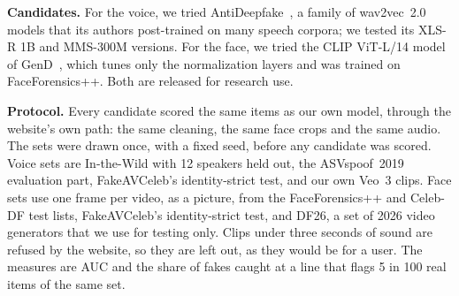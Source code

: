 \textbf{Candidates.} For the voice, we tried AntiDeepfake~\cite{antideepfake},
a family of wav2vec~2.0 models that its authors post-trained on many speech
corpora; we tested its XLS-R 1B and MMS-300M versions. For the face, we tried
the CLIP ViT-L/14 model of GenD~\cite{gend}, which tunes only the
normalization layers and was trained on FaceForensics++. Both are released
for research use.

\textbf{Protocol.} Every candidate scored the same items as our own model,
through the website's own path: the same cleaning, the same face crops and the
same audio. The sets were drawn once, with a fixed seed, before any candidate
was scored. Voice sets are In-the-Wild with 12 speakers held out, the
ASVspoof~2019 evaluation part, FakeAVCeleb's identity-strict test, and our
own Veo~3 clips. Face sets use one frame per video, as a picture, from the
FaceForensics++ and Celeb-DF test lists, FakeAVCeleb's identity-strict test,
and DF26, a set of 2026 video generators that we use for testing only.
Clips under three seconds of sound are refused by the website, so they are
left out, as they would be for a user. The measures are AUC and the share of
fakes caught at a line that flags 5 in 100 real items of the same set.

